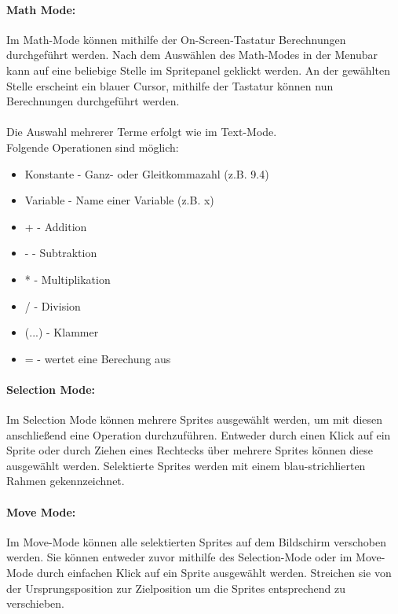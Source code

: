 \paragraph{Math Mode:}

Im Math-Mode können mithilfe der On-Screen-Tastatur Berechnungen durchgeführt werden. Nach dem Auswählen des Math-Modes in der Menubar kann auf eine beliebige Stelle im Spritepanel geklickt werden. An der gewählten Stelle erscheint ein blauer Cursor, mithilfe der Tastatur können nun Berechnungen durchgeführt werden.\\
\\
Die Auswahl mehrerer Terme erfolgt wie im Text-Mode.
\\
Folgende Operationen sind möglich:

\begin{itemize}
	\item Konstante - Ganz- oder Gleitkommazahl (z.B. 9.4)
	\item Variable - Name einer Variable (z.B. x)
	\item + - Addition
	\item - - Subtraktion
	\item * - Multiplikation
	\item / - Division
	\item (...) - Klammer
	\item = - wertet eine Berechung aus
\end{itemize}

\paragraph{Selection Mode:}

Im Selection Mode können mehrere Sprites ausgewählt werden, um mit diesen anschließend eine Operation durchzuführen. Entweder durch einen Klick auf ein Sprite oder durch Ziehen eines Rechtecks über mehrere Sprites können diese ausgewählt werden. Selektierte Sprites werden mit einem blau-strichlierten Rahmen gekennzeichnet.

\paragraph{Move Mode:}

Im Move-Mode können alle selektierten Sprites auf dem Bildschirm verschoben werden. Sie können entweder zuvor mithilfe des Selection-Mode oder im Move-Mode durch einfachen Klick auf ein Sprite ausgewählt werden. Streichen sie von der Ursprungsposition zur Zielposition um die Sprites entsprechend zu verschieben.


